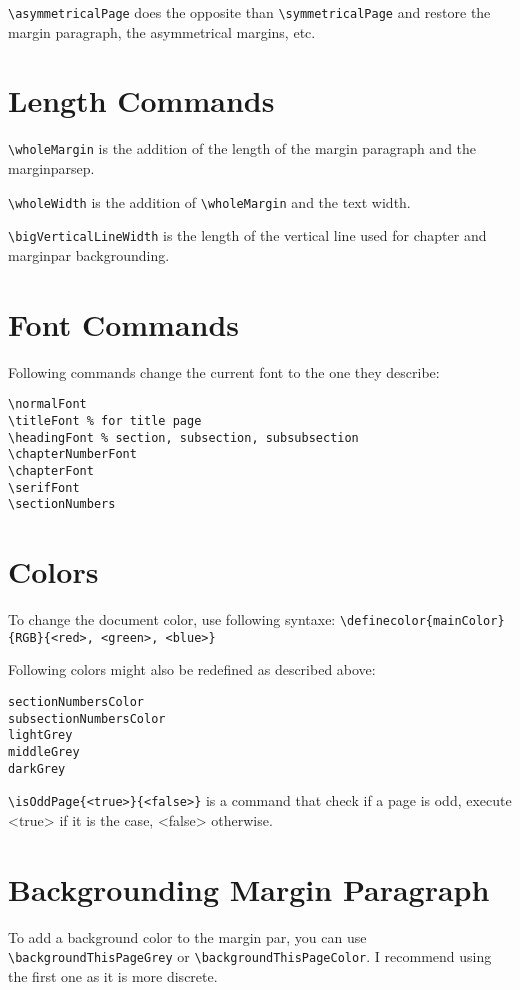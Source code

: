 \documentclass[a4paper, 11pt, oneside, fleqn]{article}
\begin{document}
	\lstinline[breaklines]|\asymmetricalPage| does the opposite than \lstinline[breaklines]|\symmetricalPage| and restore the margin paragraph, the asymmetrical margins, etc.
	
	\section{Length Commands}
	\lstinline[breaklines]|\wholeMargin| is the addition of the length of the margin paragraph and the marginparsep.
	
	\lstinline[breaklines]|\wholeWidth| is the addition of \lstinline[breaklines]|\wholeMargin| and the text width.
	
	\lstinline|\bigVerticalLineWidth| is the length of the vertical line used for chapter and marginpar backgrounding.
	
	\section{Font Commands}
	Following commands change the current font to the one they describe:
	\begin{lstlisting}
\normalFont
\titleFont % for title page
\headingFont % section, subsection, subsubsection
\chapterNumberFont
\chapterFont
\serifFont
\sectionNumbers
	\end{lstlisting}
	
	\section{Colors}
	To change the document color, use following syntaxe: \lstinline[breaklines]|\definecolor{mainColor}{RGB}{<red>, <green>, <blue>}|
	
	Following colors might also be redefined as described above:
	\begin{lstlisting}
sectionNumbersColor
subsectionNumbersColor
lightGrey
middleGrey
darkGrey
	\end{lstlisting}
	
	\lstinline[breaklines]|\isOddPage{<true>}{<false>}| is a command that check if a page is odd, execute <true> if it is the case, <false> otherwise.
	
	\section{Backgrounding Margin Paragraph}
	To add a background color to the margin par, you can use \lstinline[breaklines]|\backgroundThisPageGrey| or \lstinline[breaklines]|\backgroundThisPageColor|. I recommend using the first one as it is more discrete.	
	
\end{document}

